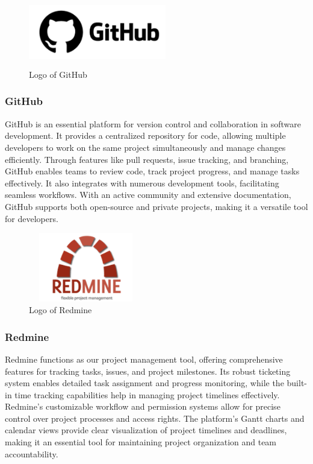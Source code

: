 \documentclass[conference]{IEEEtran}
\begin{document}
        \begin{figure}[htbp]
            \centerline{\includegraphics[width=6cm, height=3cm]{Images/logo/github.png}}
            \caption{Logo of GitHub}
            \label{fig}
        \end{figure}
        \subsubsection{GitHub}
            GitHub is an essential platform for version control and collaboration in software development. It provides a centralized repository for code, allowing multiple developers to work on the same project simultaneously and manage changes efficiently. Through features like pull requests, issue tracking, and branching, GitHub enables teams to review code, track project progress, and manage tasks effectively. It also integrates with numerous development tools, facilitating seamless workflows. With an active community and extensive documentation, GitHub supports both open-source and private projects, making it a versatile tool for developers.

        \begin{figure}[htbp]
            \centerline{\includegraphics[width=5cm, height=3cm]{Images/logo/redmine.png}}
            \caption{Logo of Redmine}
            \label{fig}
        \end{figure}
        \subsubsection{Redmine}
            Redmine functions as our project management tool, offering comprehensive features for tracking tasks, issues, and project milestones. Its robust ticketing system enables detailed task assignment and progress monitoring, while the built-in time tracking capabilities help in managing project timelines effectively. Redmine's customizable workflow and permission systems allow for precise control over project processes and access rights. The platform's Gantt charts and calendar views provide clear visualization of project timelines and deadlines, making it an essential tool for maintaining project organization and team accountability.
\end{document}
